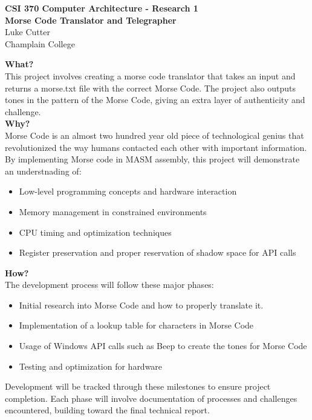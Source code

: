 \documentclass[twoside]{article}
\begin{document}
\begin{center}
\large\textbf{CSI 370 Computer Architecture - Research 1} \\
\large\textbf{Morse Code Translator and Telegrapher} \\
Luke Cutter \\
Champlain College \\[1em]
\end{center}

\noindent \textbf{What?} \\
This project involves creating a morse code translator that takes an input and returns a morse.txt file with the correct Morse Code. The project also outputs tones in the pattern of the Morse Code, giving an extra layer of authenticity and challenge. \\ 

\noindent \textbf{Why?} \\
Morse Code is an almost two hundred year old piece of technological genius that revolutionized the way humans contacted each other with important information. By implementing Morse code in MASM assembly, this project will demonstrate an understnading of:
\begin{itemize}
\item Low-level programming concepts and hardware interaction
\item Memory management in constrained environments
\item CPU timing and optimization techniques
\item Register preservation and proper reservation of shadow space for API calls \\ 
\end{itemize}

\noindent \textbf{How?} \\
The development process will follow these major phases:
\begin{itemize}
\item Initial research into Morse Code and how to properly translate it.
\item Implementation of a lookup table for characters in Morse Code
\item Usage of Windows API calls such as Beep to create the tones for Morse Code
\item Testing and optimization for hardware
\end{itemize}

Development will be tracked through these milestones to ensure project completion. Each phase will involve documentation of processes and challenges encountered, building toward the final technical report. \\ 
\end{document}
